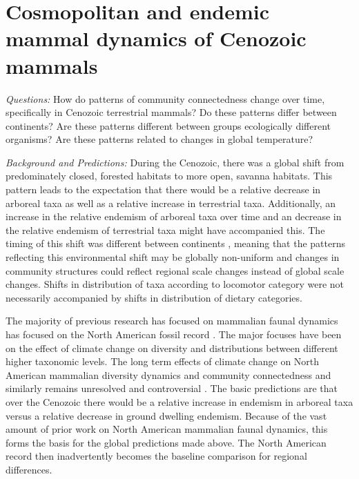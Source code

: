 \documentclass[12pt,letterpaper]{article}
\begin{document}
\section{Cosmopolitan and endemic mammal dynamics of Cenozoic mammals}

\textit{Questions:} How do patterns of community connectedness change over time, specifically in Cenozoic terrestrial mammals? Do these patterns differ between continents? Are these patterns different between groups ecologically different organisms? Are these patterns related to changes in global temperature?

\textit{Background and Predictions:}
During the Cenozoic, there was a global shift from predominately closed, forested habitats to more open, savanna habitats. This pattern leads to the expectation that there would be a relative decrease in arboreal taxa as well as a relative increase in terrestrial taxa. Additionally, an increase in the relative endemism of arboreal taxa over time and an decrease in the relative endemism of terrestrial taxa might have accompanied this. The timing of this shift was different between continents \citep{Stromberg2005,Stromberg2013}, meaning that the patterns reflecting this environmental shift may be globally non-uniform and changes in community structures could reflect regional scale changes instead of global scale changes. Shifts in distribution of taxa according to locomotor category were not necessarily accompanied by shifts in distribution of dietary categories.

The majority of previous research has focused on mammalian faunal dynamics has focused on the North American fossil record \citep{Alroy2000g,Alroy1996a,Alroy1998,Barnosky2001a,Simpson1944,Simpson1953,Badgley2013,Blois2009,Figueirido2012,Gunnell1995,Hadly2001}. The major focuses have been on the effect of climate change on diversity and distributions between different higher taxonomic levels. The long term effects of climate change on North American mammalian diversity dynamics and community connectedness and similarly remains unresolved and controversial \citep{Alroy2000g,Blois2009,Figueirido2012,Barnosky2001a}. The basic predictions are that over the Cenozoic there would be a relative increase in endemism in arboreal taxa versus a relative decrease in ground dwelling endemism. Because of the vast amount of prior work on North American mammalian faunal dynamics, this forms the basis for the global predictions made above. The North American record then inadvertently becomes the baseline comparison for regional differences.
\end{document}
